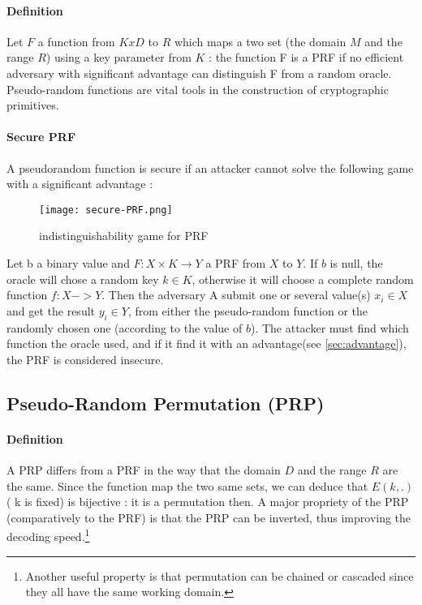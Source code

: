 \paragraph{Definition \\}
Let $F$ a function from $KxD$ to $R$ which maps a two set (the domain $M$ and the range $R$) using a key parameter from $K$ : the function F is a PRF if no efficient adversary with significant advantage can distinguish F from a random oracle. Pseudo-random functions are vital tools in the construction of cryptographic primitives.

\paragraph{Secure PRF \\}
\label{sec:IND-Game-PRF}

A pseudorandom function is secure if an attacker cannot solve the following game with a significant advantage :

\begin{figure}[h!]
	\centering
		\texttt{[image: secure-PRF.png]}
	\caption{indistinguishability game for PRF}
	\label{fig:IND-Game-PRF}
\end{figure}

Let b a binary value and $F: X\times K \rightarrow Y$  a PRF from $X$ to $Y$. If $b$ is null, the oracle will chose a random key $k\in K$, otherwise it will choose a complete random function $f:X->Y$. Then the adversary A submit one or several value(s) $x_i \in X$ and get the result $y_i \in Y$, from either the pseudo-random function or the randomly chosen one (according to the value of $b$). The attacker must find which function the oracle used, and if it find it with an advantage(see \ref{sec:advantage}), the PRF is considered insecure.


\subsection{Pseudo-Random Permutation   (PRP)}


\paragraph{Definition \\}

A PRP differs from a PRF in the way that the domain $D$ and the range $R$ are the same. Since the function map the two same sets, we can deduce that $E(k,.)$ ( k is fixed) is bijective : it is a permutation then.
A major propriety of the PRP (comparatively to the PRF) is that the PRP can be inverted, thus improving the decoding speed.\footnote{Another useful property is that permutation can be chained or cascaded since they all have the same working domain.}

